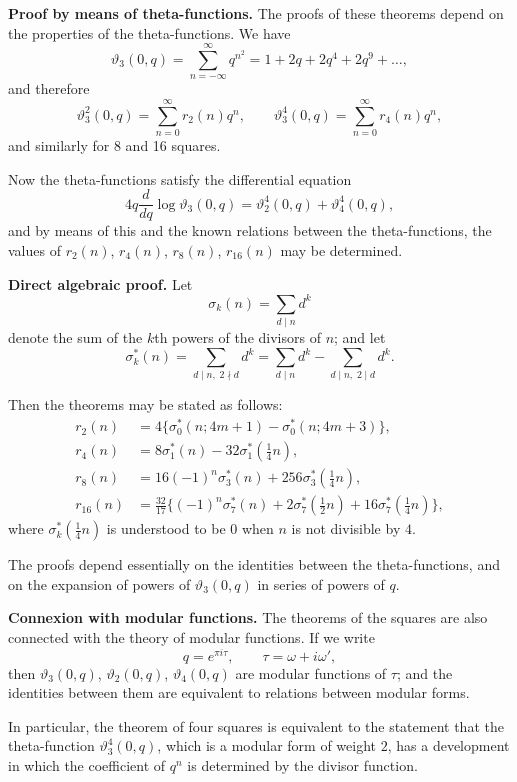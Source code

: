 \documentclass[11pt,a4paper]{book}
\begin{document}
\textbf{Proof by means of theta-functions.} The proofs of these theorems depend
on the properties of the theta-functions. We have
%
\[
\vartheta_3(0, q) = \sum_{n=-\infty}^{\infty} q^{n^2}
= 1 + 2q + 2q^4 + 2q^9 + \ldots,
\]
and therefore
%
\[
\vartheta_3^2(0, q) = \sum_{n=0}^{\infty} r_2(n) q^n,
\qquad
\vartheta_3^4(0, q) = \sum_{n=0}^{\infty} r_4(n) q^n,
\]
%
and similarly for 8 and 16 squares.

Now the theta-functions satisfy the differential equation
%
\[
4q \frac{d}{dq} \log \vartheta_3(0, q)
= \vartheta_2^4(0, q) + \vartheta_4^4(0, q),
\]
%
and by means of this and the known relations between the theta-functions,
the values of $r_2(n)$, $r_4(n)$, $r_8(n)$, $r_{16}(n)$ may be determined.

\textbf{Direct algebraic proof.} Let
%
\[
\sigma_k(n) = \sum_{d \mid n} d^k
\]
%
denote the sum of the $k$th powers of the divisors of $n$; and let
%
\[
\sigma_k^*(n) = \sum_{d \mid n,\; 2 \nmid d} d^k
= \sum_{d \mid n} d^k - \sum_{d \mid n,\; 2 \mid d} d^k.
\]

Then the theorems may be stated as follows:
\begin{align*}
r_2(n) &= 4\{\sigma_0^*(n; 4m+1) - \sigma_0^*(n; 4m+3)\}, \\
r_4(n) &= 8\sigma_1^*(n) - 32\sigma_1^*(\tfrac{1}{4}n), \\
r_8(n) &= 16(-1)^n \sigma_3^*(n) + 256\sigma_3^*(\tfrac{1}{4}n), \\
r_{16}(n) &= \tfrac{32}{17} \{(-1)^n \sigma_7^*(n) + 2\sigma_7^*(\tfrac{1}{2}n)
+ 16\sigma_7^*(\tfrac{1}{4}n)\},
\end{align*}
where $\sigma_k^*(\tfrac{1}{4}n)$ is understood to be $0$ when $n$ is not divisible by $4$.

The proofs depend essentially on the identities between the theta-functions,
and on the expansion of powers of $\vartheta_3(0, q)$ in series of powers of $q$.

\textbf{Connexion with modular functions.} The theorems of the squares are also
connected with the theory of modular functions. If we write
%
\[
q = e^{\pi i \tau}, \qquad \tau = \omega + i\omega',
\]
%
then $\vartheta_3(0, q)$, $\vartheta_2(0, q)$, $\vartheta_4(0, q)$ are modular functions of $\tau$; and the
identities between them are equivalent to relations between modular forms.

In particular, the theorem of four squares is equivalent to the statement
that the theta-function $\vartheta_3^4(0, q)$, which is a modular form of weight $2$, has
a development in which the coefficient of $q^n$ is determined by the divisor
function.
\end{document}
